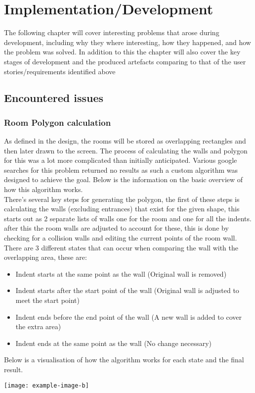\section{Implementation/Development}
The following chapter will cover interesting problems that arose during development, including why they where interesting, how they happened, and how the problem was solved. In addition to this the chapter will also cover the key stages of development and the produced artefacts comparing to that of the user stories/requirements identified above

\subsection{Encountered issues}
\subsubsection{Room Polygon calculation}
As defined in the design, the rooms will be stored as overlapping rectangles and then later drawn to the screen. The process of calculating the walls and polygon for this was a lot more complicated than initially anticipated. Various google searches for this problem returned no results as such a custom algorithm was designed to achieve the goal. Below is the information on the basic overview of how this algorithm works.\\

There's several key steps for generating the polygon, the first of these steps is calculating the walls (excluding entrances) that exist for the given shape, this starts out as 2 separate lists of walls one for the room and one for all the indents. after this the room walls are adjusted to account for these, this is done by checking for a collision walls and editing the current points of the room wall. There are 3 different states that can occur when comparing the wall with the overlapping area, these are:
\begin{itemize}
	\item Indent starts at the same point as the wall (Original wall is removed)
	\item Indent starts after the start point of the wall (Original wall is adjusted to meet the start point)
	\item Indent ends before the end point of the wall (A new wall is added to cover the extra area)
	\item Indent ends at the same point as the wall (No change necessary)	
\end{itemize}
Below is a visualisation of how the algorithm works for each state and the final result.
\begin{center}
	\texttt{[image: example-image-b]}
\end{center}

